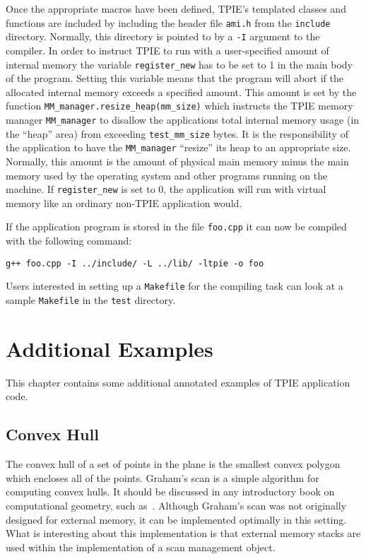 Once the appropriate macros have been defined, TPIE's templated classes and
functions are included by including the header file \verb|ami.h| from the
\verb|include| directory. Normally, this directory is pointed to by a
\verb|-I| argument to the compiler. In order to instruct TPIE to run with a
user-specified amount of internal memory the variable \verb|register_new|
has to be set to 1 in the main body of the program. Setting this variable
means that the program will abort if the allocated internal memory exceeds
a specified amount.
This amount is set by the function \verb|MM_manager.resize_heap(mm_size)|
which instructs the TPIE memory manager \verb|MM_manager| to disallow the
applications total internal memory usage (in the ``heap'' area) from
exceeding \verb|test_mm_size| bytes. It is the responsibility of the
application to have the \verb|MM_manager| ``resize'' its heap to an
appropriate size. Normally, this amount is the amount of physical main
memory minus the main memory used by the operating system and other
programs running on the machine. If \verb|register_new| is set to 0, the
application will run with virtual memory like an ordinary non-TPIE
application would.

If the application program is stored in the file \verb|foo.cpp| it can now be
compiled with the following command:

\begin{verbatim}
g++ foo.cpp -I ../include/ -L ../lib/ -ltpie -o foo
\end{verbatim}

Users interested in setting up a \verb|Makefile| for the compiling task can
look at a sample \verb|Makefile| in the \verb|test| directory.


\chapter{Additional Examples} \label{ch:examples}

This chapter contains some additional annotated examples of 
TPIE application code.

\section{Convex Hull}
\label{sec:convex-hull}

The convex hull of a set of points in the plane is the smallest convex
polygon which encloses all of the points.  Graham's scan is a simple
algorithm for computing convex hulls.  It should be discussed in any
introductory book on computational geometry, such
as~\cite{preparata:computational}.  Although Graham's scan was not
originally designed for external memory, it can be implemented optimally in
this setting.  What is interesting about this implementation is that
external memory stacks are used within the implementation of a scan
management object.


